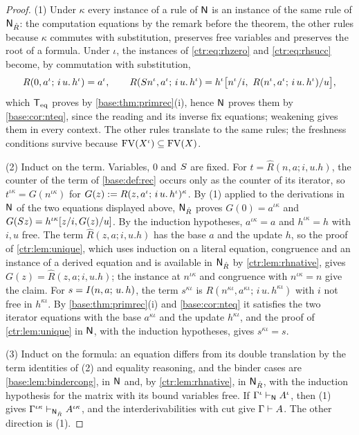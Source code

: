 \begin{proof}
(1) Under $\kappa$ every instance of a rule of $\mathsf{N}$ is an instance of the same rule of
$\mathsf{N}_{\hat R}$: the computation equations by the remark before the theorem, the other rules
because $\kappa$ commutes with substitution, preserves free variables and preserves the root of
a formula. Under $\iota$, the instances of \eqref{ctr:eq:rhzero} and \eqref{ctr:eq:rhsucc}
become, by commutation with substitution,
\[
 R(0,a^\iota;\,i\,u.\,h^\iota)=a^\iota,\qquad
 R(\Suc n^\iota,a^\iota;\,i\,u.\,h^\iota)
 =h^\iota\bigl[n^\iota/i,\ R(n^\iota,a^\iota;\,i\,u.\,h^\iota)/u\bigr],
\]
which $\mathsf{T}_{\mathrm{eq}}$ proves by \cref{base:thm:primrec}(i), hence $\mathsf{N}$ proves them by
\cref{base:cor:nteq}, since the reading and its inverse fix equations; weakening gives them in
every context. The other rules translate to the same rules; the freshness conditions survive
because $\operatorname{FV}(X^\iota)\subseteq\operatorname{FV}(X)$.

(2) Induct on the term. Variables, $0$ and $S$ are fixed. For $t=\hat R(n,a;i,u.h)$, the
counter of the term of \cref{base:def:rec} occurs only as the counter of its iterator, so
$t^{\iota\kappa}=G(n^{\iota\kappa})$ for $G(z)\mathrel{:=} R(z,a^\iota;\,i\,u.\,h^\iota)^\kappa$. By
(1) applied to the derivations in $\mathsf{N}$ of the two equations displayed above,
$\mathsf{N}_{\hat R}$ proves $G(0)=a^{\iota\kappa}$ and
$G(S z)=h^{\iota\kappa}[z/i,G(z)/u]$. By the induction hypotheses,
$a^{\iota\kappa}=a$ and $h^{\iota\kappa}=h$ with $i,u$ free. The term $\hat R(z,a;i,u.h)$ has the
base $a$ and the update $h$, so the proof of \cref{ctr:lem:unique}, which uses induction on a
literal equation, congruence and an instance of a derived equation and is available in
$\mathsf{N}_{\hat R}$ by \cref{ctr:lem:rhnative}, gives $G(z)=\hat R(z,a;i,u.h)$; the instance at
$n^{\iota\kappa}$ and congruence with $n^{\iota\kappa}=n$ give the claim. For
$s=I(n,a;\,u.\,h)$, the term $s^{\kappa\iota}$ is $R(n^{\kappa\iota},a^{\kappa\iota};\,i\,u.\,h^{\kappa\iota})$
with $i$ not free in $h^{\kappa\iota}$. By \cref{base:thm:primrec}(i) and \cref{base:cor:nteq}
it satisfies the two iterator equations with the base $a^{\kappa\iota}$ and the update
$h^{\kappa\iota}$, and the proof of \cref{ctr:lem:unique} in $\mathsf{N}$, with the induction
hypotheses, gives $s^{\kappa\iota}=s$.

(3) Induct on the formula: an equation differs from its double translation by the term
identities of (2) and equality reasoning, and the binder cases are
\cref{base:lem:bindercong}, in $\mathsf{N}$ and, by \cref{ctr:lem:rhnative}, in $\mathsf{N}_{\hat R}$, with
the induction hypothesis for the matrix with its bound variables free. If
$\Gamma^\iota\vdash_{\mathsf{N}}A^\iota$, then (1) gives
$\Gamma^{\iota\kappa}\vdash_{\mathsf{N}_{\hat R}}A^{\iota\kappa}$, and the interderivabilities with
cut give $\Gamma\vdash A$. The other direction is (1).


\end{proof}
